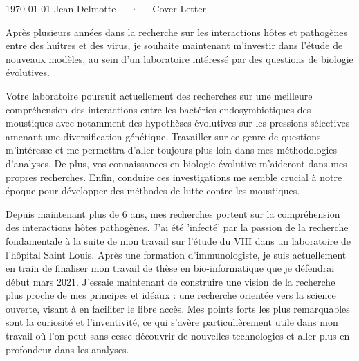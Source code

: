\documentclass[11pt, a4paper]{awesome-cv}
\begin{document}
\makecvheader[R]

\makecvfooter
  {\today}
  {Jean Delmotte~~~·~~~Cover Letter}
  {\thepage}
\makelettertitle

\begin{cvletter}

Après plusieurs années dans la recherche sur les interactions hôtes et pathogènes entre des huîtres et des virus, je souhaite maintenant m’investir dans l’étude de nouveaux modèles, au sein d’un laboratoire intéressé par des questions de biologie évolutives.



Votre laboratoire poursuit actuellement des recherches sur une meilleure compréhension des interactions entre les bactéries endosymbiotiques des moustiques avec notamment des hypothèses évolutives sur les pressions sélectives amenant une diversification génétique. Travailler sur ce genre de questions m’intéresse et me permettra d’aller toujours plus loin dans mes méthodologies d’analyses. De plus, vos connaissances en biologie évolutive m’aideront dans mes propres recherches. Enfin, conduire ces investigations me semble crucial à notre époque pour développer des méthodes de lutte contre les moustiques.


Depuis maintenant plus de 6 ans, mes recherches portent sur la compréhension des interactions hôtes pathogènes. J'ai été 'infecté' par la passion de la recherche fondamentale à la suite de mon travail sur l'étude du VIH dans un laboratoire de l’hôpital Saint Louis. Après une formation d’immunologiste, je suis actuellement en train de finaliser mon travail de thèse en bio-informatique que je défendrai début mars 2021. J’essaie maintenant de construire une vision de la recherche plus proche de mes principes et idéaux : une recherche orientée vers la science ouverte, visant à en faciliter le libre accès. Mes points forts les plus remarquables sont la curiosité et l’inventivité, ce qui s’avère particulièrement utile dans mon travail où l’on peut sans cesse découvrir de nouvelles technologies et aller plus en profondeur dans les analyses.


\end{cvletter}
\end{document}
